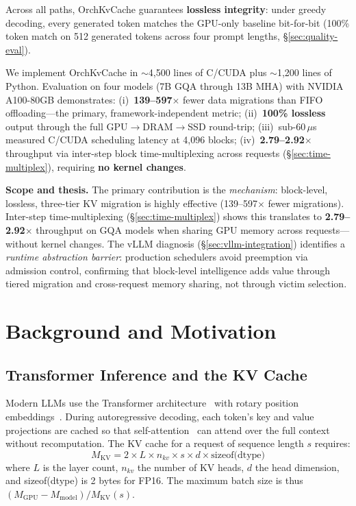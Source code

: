 \documentclass[conference]{IEEEtran}
\begin{document}
Across all paths, OrchKvCache guarantees \textbf{lossless integrity}: under greedy decoding, every generated token matches the GPU-only baseline bit-for-bit (100\% token match on 512 generated tokens across four prompt lengths, \S\ref{sec:quality-eval}).

We implement OrchKvCache in ${\sim}$4,500 lines of C/CUDA plus ${\sim}$1,200 lines of Python. Evaluation on four models (7B GQA through 13B MHA) with NVIDIA A100-80GB demonstrates: (i)~\textbf{139--597$\times$} fewer data migrations than FIFO offloading---the primary, framework-independent metric; (ii)~\textbf{100\% lossless} output through the full GPU$\to$DRAM$\to$SSD round-trip; (iii)~sub-60\,$\mu$s measured C/CUDA scheduling latency at 4,096 blocks; (iv)~\textbf{2.79--2.92$\times$} throughput via inter-step block time-multiplexing across requests (\S\ref{sec:time-multiplex}), requiring \textbf{no kernel changes}.

\textbf{Scope and thesis.} The primary contribution is the \emph{mechanism}: block-level, lossless, three-tier KV migration is highly effective (139--597$\times$ fewer migrations). Inter-step time-multiplexing (\S\ref{sec:time-multiplex}) shows this translates to \textbf{2.79--2.92$\times$} throughput on GQA models when sharing GPU memory across requests---without kernel changes. The vLLM diagnosis (\S\ref{sec:vllm-integration}) identifies a \emph{runtime abstraction barrier}: production schedulers avoid preemption via admission control, confirming that block-level intelligence adds value through tiered migration and cross-request memory sharing, not through victim selection.

\section{Background and Motivation}
\subsection{Transformer Inference and the KV Cache}

Modern LLMs use the Transformer architecture~\cite{transformer} with rotary position embeddings~\cite{rope}. During autoregressive decoding, each token's key and value projections are cached so that self-attention~\cite{transformer} can attend over the full context without recomputation. The KV cache for a request of sequence length $s$ requires:
\begin{equation}
M_{\text{KV}} = 2 \times L \times n_{kv} \times s \times d \times \text{sizeof(dtype)}
\label{eq:kv-mem}
\end{equation}
where $L$ is the layer count, $n_{kv}$ the number of KV heads, $d$ the head dimension, and sizeof(dtype) is 2 bytes for FP16. The maximum batch size is thus $(M_{\text{GPU}} - M_{\text{model}}) / M_{\text{KV}}(s)$.
\end{document}

